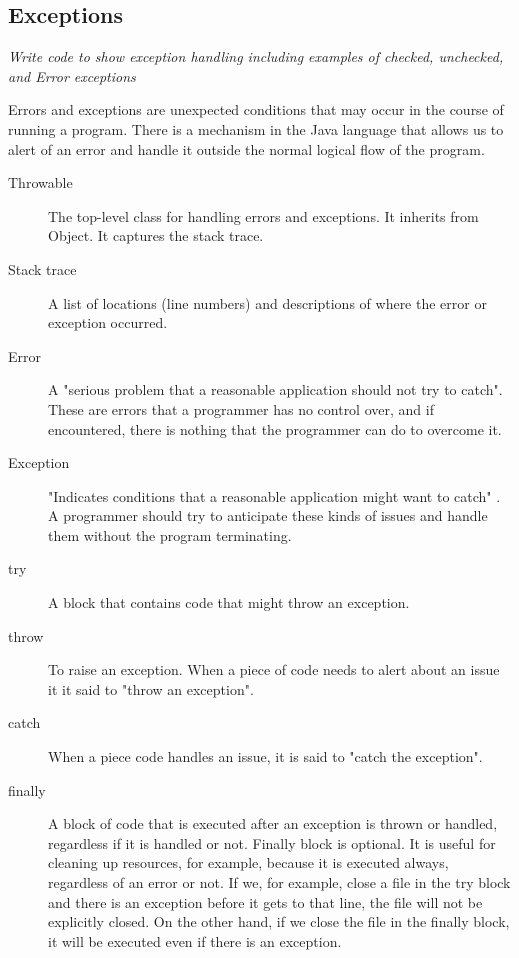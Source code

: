 \subsection{Exceptions}
\textit{Write code to show exception handling including examples of checked, unchecked, and Error exceptions}

Errors and exceptions are unexpected conditions that may occur in the course of running a program. There is a mechanism in the Java language that allows us to alert of an error and handle it outside the normal logical flow of the program.

\begin{description}
\item[Throwable] The top-level class for handling errors and exceptions. It inherits from Object. It captures the stack trace.
\item[Stack trace] A list of locations (line numbers) and descriptions of where the error or exception occurred.
\item[Error] A "serious problem that a reasonable application should not try to catch"\cite{error}. These are errors that a programmer has no control over, and if encountered, there is nothing that the programmer can do to overcome it.
\item[Exception] "Indicates conditions that a reasonable application might want to catch" \cite{exception}. A programmer should try to anticipate these kinds of issues and handle them without the program terminating.
\item[try] A block that contains code that might throw an exception.
\item[throw] To raise an exception. When a piece of code needs to alert about an issue it it said to "throw an exception".
\item[catch] When a piece code handles an issue, it is said to "catch the exception".
\item[finally] A block of code that is executed after an exception is thrown or handled, regardless if it is handled or not.  Finally block is optional. It is useful for cleaning up resources, for example, because it is executed always, regardless of an error or not. If we, for example, close a file in the try block and there is an exception before it gets to that line, the file will not be explicitly closed. On the other hand, if we close the file in the finally block, it will be executed even if there is an exception.
\end{description}


